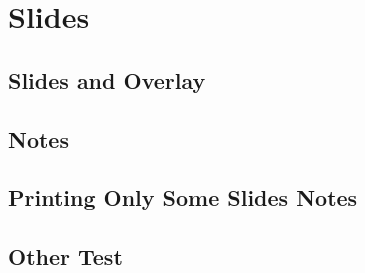 \section{Slides}
\subsection{Slides and Overlay}


\subsection{Notes}


\subsection{Printing Only Some Slides Notes}


\subsection{Other Test}